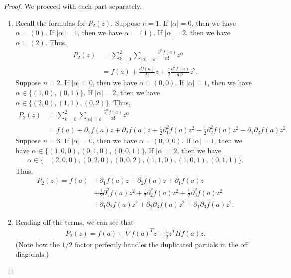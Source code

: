 \documentclass[12pt]{article}
\theoremstyle{remark}
\theoremstyle{named}
\renewcommand{\a}{\alpha}
\begin{document}
\begin{proof}
    We proceed with each part separately.
    \begin{enumerate}
        \item Recall the formulas for \(P_2(z)\). Suppose \(n = 1\). If \(|\a| = 0\), then we have \(\a = (0)\). If \(|\a| = 1\), then we have \(\a = (1)\). If \(|\a| = 2\), then we have \(\a = (2)\). Thus,
        \begin{align*}
            P_2(z) &= \sum_{k = 0}^{2}\sum_{|\a| = k} \frac{\partial^\a f(a)}{\a!}z^\a \\
            &= f(a) + \frac{df(a)}{dz}z + \frac{1}{2}\frac{d^2f(a)}{dz^2}z^2.
        \end{align*}
        Suppose \(n = 2\). If \(|\a| = 0\), then we have \(\a = (0, 0)\). If \(|\a| = 1\), then we have \(\a \in \{(1, 0), (0, 1)\}\). If \(|\a| = 2\), then we have \(\a \in \{(2, 0), (1, 1), (0, 2)\}\). Thus,
        \begin{align*}
            P_2(z) &= \sum_{k = 0}^{2}\sum_{|\a| = k} \frac{\partial^\a f(a)}{\a!}z^\a \\
            &= f(a) + \partial_1 f(a) z + \partial_2 f(a) z + \frac{1}{2}\partial_1^2 f(a) z^2 + \frac{1}{2}\partial_2^2 f(a) z^2 + \partial_1\partial_2 f(a) z^2.
        \end{align*}
        Suppose \(n = 3\). If \(|\a| = 0\), then we have \(\a = (0, 0, 0)\). If \(|\a| = 1\), then we have \(\a \in \{(1, 0, 0), (0, 1, 0), (0, 0, 1)\}\). If \(|\a| = 2\), then we have
        \begin{align*}
            \a \in \{&(2, 0, 0), (0, 2, 0), (0, 0, 2), (1, 1, 0), (1, 0, 1), (0, 1, 1)\}.
        \end{align*} Thus,
        \begin{align*}
            P_2(z) = f(a) &+ \partial_1 f(a) z + \partial_2 f(a) z + \partial_1 f(a) z \\
            &+ \frac{1}{2}\partial_1^2 f(a) z^2 + \frac{1}{2}\partial_2^2 f(a) z^2 + \frac{1}{2}\partial_3^2 f(a) z^2 \\
            &+ \partial_1\partial_2 f(a) z^2 + \partial_2\partial_3 f(a) z^2 + \partial_1\partial_3 f(a) z^2.
        \end{align*}
        \item Reading off the terms, we can see that 
        \begin{align*}
            P_2(z) = f(a) + \nabla f(a)^T z + \frac{1}{2} z^T H f(a) z.
        \end{align*}
        (Note how the \(1/2\) factor perfectly handles the duplicated partials in the off diagonals.)

\end{enumerate}
\end{proof}
\end{document}
